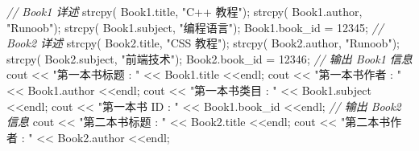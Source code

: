 \documentclass[
]{article}
\newenvironment{Shaded}{}{}
\newcommand{\CommentTok}[1]{\textcolor[rgb]{0.38,0.63,0.69}{\textit{#1}}}
\newcommand{\DecValTok}[1]{\textcolor[rgb]{0.25,0.63,0.44}{#1}}
\newcommand{\NormalTok}[1]{#1}
\newcommand{\OperatorTok}[1]{\textcolor[rgb]{0.40,0.40,0.40}{#1}}
\newcommand{\StringTok}[1]{\textcolor[rgb]{0.25,0.44,0.63}{#1}}
\begin{document}
\begin{Shaded}
\begin{Highlighting}[]
   \CommentTok{// Book1 详述}
\NormalTok{   strcpy}\OperatorTok{(}\NormalTok{ Book1}\OperatorTok{.}\NormalTok{title}\OperatorTok{,} \StringTok{"C++ 教程"}\OperatorTok{);}   
\NormalTok{   strcpy}\OperatorTok{(}\NormalTok{ Book1}\OperatorTok{.}\NormalTok{author}\OperatorTok{,} \StringTok{"Runoob"}\OperatorTok{);} 
\NormalTok{   strcpy}\OperatorTok{(}\NormalTok{ Book1}\OperatorTok{.}\NormalTok{subject}\OperatorTok{,} \StringTok{"编程语言"}\OperatorTok{);}   
\NormalTok{   Book1}\OperatorTok{.}\NormalTok{book\_id }\OperatorTok{=} \DecValTok{12345}\OperatorTok{;} 
   \CommentTok{// Book2 详述}
\NormalTok{   strcpy}\OperatorTok{(}\NormalTok{ Book2}\OperatorTok{.}\NormalTok{title}\OperatorTok{,} \StringTok{"CSS 教程"}\OperatorTok{);}   
\NormalTok{   strcpy}\OperatorTok{(}\NormalTok{ Book2}\OperatorTok{.}\NormalTok{author}\OperatorTok{,} \StringTok{"Runoob"}\OperatorTok{);}   
\NormalTok{   strcpy}\OperatorTok{(}\NormalTok{ Book2}\OperatorTok{.}\NormalTok{subject}\OperatorTok{,} \StringTok{"前端技术"}\OperatorTok{);}   
\NormalTok{   Book2}\OperatorTok{.}\NormalTok{book\_id }\OperatorTok{=} \DecValTok{12346}\OperatorTok{;} 
   \CommentTok{// 输出 Book1 信息}
\NormalTok{   cout }\OperatorTok{\textless{}\textless{}} \StringTok{"第一本书标题 : "} \OperatorTok{\textless{}\textless{}}\NormalTok{ Book1}\OperatorTok{.}\NormalTok{title }\OperatorTok{\textless{}\textless{}}\NormalTok{endl}\OperatorTok{;}   
\NormalTok{   cout }\OperatorTok{\textless{}\textless{}} \StringTok{"第一本书作者 : "} \OperatorTok{\textless{}\textless{}}\NormalTok{ Book1}\OperatorTok{.}\NormalTok{author }\OperatorTok{\textless{}\textless{}}\NormalTok{endl}\OperatorTok{;}   
\NormalTok{   cout }\OperatorTok{\textless{}\textless{}} \StringTok{"第一本书类目 : "} \OperatorTok{\textless{}\textless{}}\NormalTok{ Book1}\OperatorTok{.}\NormalTok{subject }\OperatorTok{\textless{}\textless{}}\NormalTok{endl}\OperatorTok{;}   
\NormalTok{   cout }\OperatorTok{\textless{}\textless{}} \StringTok{"第一本书 ID : "} \OperatorTok{\textless{}\textless{}}\NormalTok{ Book1}\OperatorTok{.}\NormalTok{book\_id }\OperatorTok{\textless{}\textless{}}\NormalTok{endl}\OperatorTok{;} 
   \CommentTok{// 输出 Book2 信息}
\NormalTok{   cout }\OperatorTok{\textless{}\textless{}} \StringTok{"第二本书标题 : "} \OperatorTok{\textless{}\textless{}}\NormalTok{ Book2}\OperatorTok{.}\NormalTok{title }\OperatorTok{\textless{}\textless{}}\NormalTok{endl}\OperatorTok{;}   
\NormalTok{   cout }\OperatorTok{\textless{}\textless{}} \StringTok{"第二本书作者 : "} \OperatorTok{\textless{}\textless{}}\NormalTok{ Book2}\OperatorTok{.}\NormalTok{author }\OperatorTok{\textless{}\textless{}}\NormalTok{endl}\OperatorTok{;}   

\end{Highlighting}
\end{Shaded}
\end{document}
